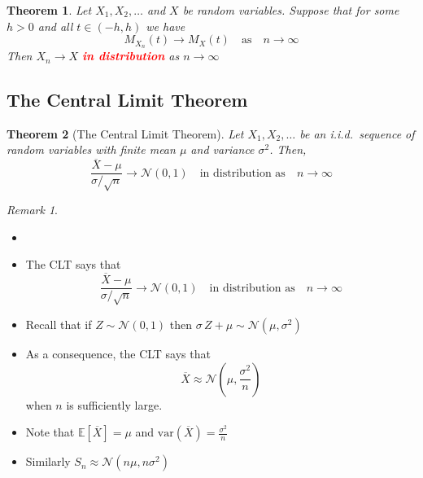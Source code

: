 \documentclass{article}
\newcommand{\E}{\mathbb{E}}
\newcommand{\var}{\text{var}}
\newcommand{\bfred}[1]{\textcolor{red}{\textbf{#1}}}
\theoremstyle{plain}
\newtheorem{thm}{Theorem}[section]
\theoremstyle{definition}
\theoremstyle{remark}
\newtheorem*{rem}{Remark}
\begin{document}
\begin{thm}
    Let $X_1,X_2,\dotsc$ and $X$ be random variables. Suppose that for some $h>0$ and all $t\in(-h,h)$ we have \[M_{X_n}(t)\rightarrow M_X(t)\quad\text{as}\quad n\rightarrow\infty\] Then $X_n\rightarrow X$ \bfred{in distribution} as $n\rightarrow\infty$
\end{thm}

\subsection{The Central Limit Theorem}

\begin{thm}[The Central Limit Theorem]
    Let $X_1,X_2,\dotsc$ be an i.i.d.\ sequence of random variables with finite mean $\mu$ and variance $\sigma^2$. Then, \[\frac{\overline{X}-\mu}{\sigma/\sqrt{n}}\rightarrow\mathcal{N}(0,1)\quad\text{in distribution as}\quad n\rightarrow\infty\]
\end{thm}

\begin{rem}
    \begin{itemize}
        \item[]
        \item The CLT says that \[\frac{\overline{X}-\mu}{\sigma/\sqrt{n}}\rightarrow\mathcal{N}(0,1)\quad\text{in distribution as}\quad n\rightarrow\infty\]
        \item Recall that if $Z\sim\mathcal{N}(0,1)$ then $\sigma\,Z+\mu\sim\mathcal{N}(\mu,\sigma^2)$
        \item As a consequence, the CLT says that \[\overline{X}\approx\mathcal{N}(\mu,\textstyle\frac{\sigma^2}{n})\] when $n$ is sufficiently large.
        \item Note that $\E[\overline{X}]=\mu$ and $\var(\overline{X})=\frac{\sigma^2}{n}$
        \item Similarly $S_n\approx\mathcal{N}(n\mu,n\sigma^2)$
    \end{itemize}
\end{rem}
\end{document}
